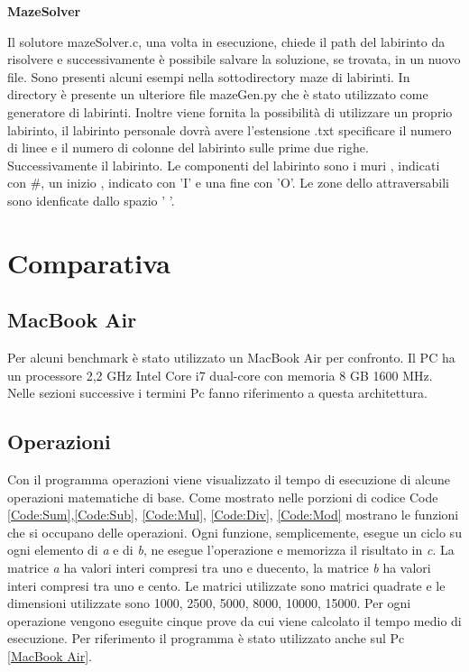 \documentclass[12pt,a4paper]{report}
\begin{document}
\vspace{0.5cm}
\begin{large}
\textbf{MazeSolver}
\end{large}

Il solutore mazeSolver.c, una volta in esecuzione, chiede il path del labirinto da risolvere e successivamente è possibile salvare la soluzione, se trovata, in un nuovo file.  Sono presenti alcuni esempi nella sottodirectory maze di labirinti.
In directory è presente un ulteriore file mazeGen.py che è stato utilizzato come generatore di labirinti. 
Inoltre viene fornita la possibilità di utilizzare un proprio labirinto, il labirinto personale dovrà avere l'estensione .txt specificare il numero di linee e il numero di colonne del labirinto sulle prime due righe. Successivamente  il labirinto. Le componenti del labirinto sono i muri , indicati con \#, un inizio , indicato con 'I' e una fine con 'O'. Le zone dello attraversabili sono idenficate dallo spazio ' '.


\chapter{Comparativa}

\section*{MacBook Air}\label{Macbook Air}
Per alcuni benchmark è stato utilizzato un MacBook Air per confronto.  Il PC ha un processore 2,2 GHz Intel Core i7 dual-core con memoria 8 GB 1600 MHz. Nelle sezioni successive i termini Pc fanno riferimento a questa architettura.

\section{Operazioni}
	Con il programma operazioni viene visualizzato il tempo di esecuzione di alcune operazioni matematiche di base. Come mostrato nelle porzioni di codice Code \ref{Code:Sum},\ref{Code:Sub}, \ref{Code:Mul}, \ref{Code:Div}, \ref{Code:Mod} mostrano le funzioni che si occupano delle operazioni. Ogni funzione, semplicemente, esegue un ciclo su ogni elemento di \textit{a} e di \textit{b}, ne esegue l'operazione e memorizza il risultato in \textit{c}.  La matrice \textit{a} ha valori interi compresi tra uno e duecento,  la matrice \textit{b} ha valori interi compresi tra uno e cento. Le matrici utilizzate sono matrici quadrate e le dimensioni utilizzate sono 1000, 2500, 5000, 8000, 10000, 15000. Per ogni operazione vengono eseguite cinque prove da cui viene calcolato il tempo medio di esecuzione. 
	Per riferimento il programma è stato utilizzato anche sul Pc \ref{MacBook Air}. 
	
\end{document}

